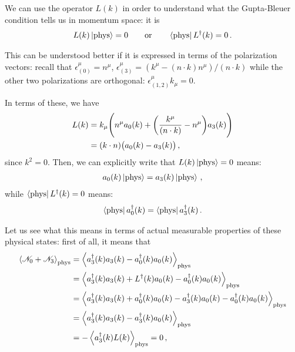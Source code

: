 \documentclass[main.tex]{subfiles}
\begin{document}
We can use the operator \(L(k)\) in order to understand what the Gupta-Bleuer condition tells us in momentum space: it is 
%
\begin{align}
L(k) \ket{\text{phys}} = 0 
\qquad \text{or} \qquad
\bra{\text{phys}} L ^\dag (k) = 0
\,.
\end{align}

This can be understood better if it is expressed in terms of the polarization vectors: recall that \(\epsilon^{\mu }_{(0)} = n^{\mu }\), \(\epsilon^{\mu }_{(3)} = (k^{\mu } - (n \cdot k) n^{\mu }) / (n \cdot k)\) while the other two polarizations are orthogonal: \(\epsilon^{\mu }_{(1, 2)} k_\mu =0 \). 

In terms of these, we have 
%
\begin{align}
L(k) &= k_{\mu } \qty(n^{\mu } a_0 (k) + \qty(\frac{k^{\mu }}{(n \cdot k)} - n^{\mu } ) a_3(k))   \\
&= (k \cdot n) \qty(a_0 (k ) - a_3 (k))
\,,
\end{align}
%
since \(k^2=0\). 
Then, we can explicitly write that \(L (k) \ket{\text{phys}} =0 \) means:
%
\begin{align}
a_0 (k) \ket{\text{phys}} = 
a_3 (k) \ket{\text{phys}} 
\,,
\end{align}
%
while \(\bra{\text{phys}} L ^\dag (k) = 0\) means:
%
\begin{align}
\bra{\text{phys}} a_0 ^\dag (k) = 
\bra{\text{phys}} a_3 ^\dag (k) 
\,.
\end{align}

Let us see what this means in terms of actual measurable properties of these physical states: first of all, it means that 
%
\begin{align}
\expval{\mathscr{N}_{0} + \mathscr{N}_{3}} _{\text{phys}} &= 
\expval{
    a ^\dag_{3} (k) a_3 (k ) - 
    a ^\dag_{0} (k) a_0 (k )
    }
_{\text{phys}}  \\
&= 
\expval{
    a ^\dag_{3} (k) a_3 (k ) +
    L ^\dag (k) a_0(k) -
    a ^\dag_{0} (k) a_0 (k )
    }
_{\text{phys}}   \\
&= 
\expval{
    a ^\dag_{3} (k) a_3 (k ) +
    a ^\dag_{0}(k) a_0(k) -
    a ^\dag_{3} (k) a_0 (k) - 
    a ^\dag_{0} (k) a_0 (k )
    }
_{\text{phys}}  \\
&= 
\expval{
    a ^\dag_{3} (k) a_3 (k ) -
    a ^\dag_{3} (k) a_0 (k) 
    }
_{\text{phys}}   \\
&= - \expval{
    a ^\dag_{3} (k) L(k)
    }
_{\text{phys}}  = 0
\,,
\end{align}
%
\end{document}
